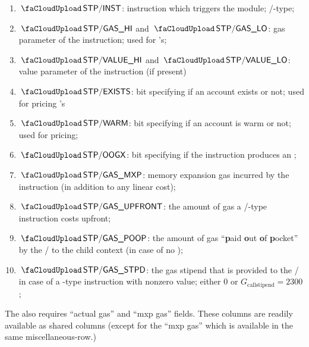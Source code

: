 \begin{enumerate}[resume]
	\item $\miscStpInst$:
		instruction which triggers the \stpMod{} module; /-type; 
	\item $\miscStpGasHi$ and $\miscStpGasLo$:
		gas parameter of the instruction; used for 's;
	\item $\miscStpValueHi$ and $\miscStpValueLo$:
		value parameter of the instruction (if present)
	\item $\miscStpAccExists$:
		bit specifying if an account exists or not; used for pricing 's
	\item $\miscStpAccWarmth$:
		bit specifying if an account is warm or not; used for  pricing;
	\item $\miscStpOogx$:
		bit specifying if the instruction produces an \oogxSH{};
	\item $\miscStpGasMxp$:
		memory expansion gas incurred by the instruction (in addition to any linear cost);
	\item $\miscStpGasUpfront$:
		the amount of gas a /-type instruction costs upfront;
	\item $\miscStpGasPoop$:
		the amount of gas ``\textbf{p}aid \textbf{o}ut \textbf{o}f \textbf{p}ocket'' by the \creator{}/\callerr{} to the child context (in case of no \oogxSH{}); 
	\item $\miscStpGasStipend$:
		the gas stipend that is provided to the \calleee{}/\createe{} in case of a -type instruction with nonzero value; either $0$ or $G_\text{callstipend} = 2300$; 
\end{enumerate}
\saNote{} The \stpMod{} also requires ``actual gas'' and ``mxp gas'' fields.
These columns are readily available as shared columns (except for the ``mxp gas'' which is available in the same miscellaneous-row.)
